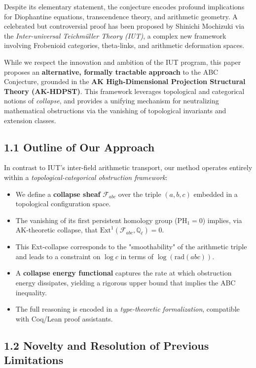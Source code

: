 \documentclass[11pt]{article}
\begin{document}
Despite its elementary statement, the conjecture encodes profound implications for Diophantine equations, transcendence theory, and arithmetic geometry. A celebrated but controversial proof has been proposed by Shinichi Mochizuki via the \emph{Inter-universal Teichm\"uller Theory (IUT)}, a complex new framework involving Frobenioid categories, theta-links, and arithmetic deformation spaces.

While we respect the innovation and ambition of the IUT program, this paper proposes an \textbf{alternative, formally tractable approach} to the ABC Conjecture, grounded in the \textbf{AK High-Dimensional Projection Structural Theory (AK-HDPST)}. This framework leverages topological and categorical notions of \emph{collapse}, and provides a unifying mechanism for neutralizing mathematical obstructions via the vanishing of topological invariants and extension classes.

\subsection*{1.1 Outline of Our Approach}

In contrast to IUT's inter-field arithmetic transport, our method operates entirely within a \emph{topological-categorical obstruction framework}:
\begin{itemize}
    \item We define a \textbf{collapse sheaf} $\mathcal{F}_{abc}$ over the triple $(a, b, c)$ embedded in a topological configuration space.
    \item The vanishing of its first persistent homology group ($\mathrm{PH}_1 = 0$) implies, via AK-theoretic collapse, that $\mathrm{Ext}^1(\mathcal{F}_{abc}, \mathbb{Q}_\ell) = 0$.
    \item This Ext-collapse corresponds to the "smoothability" of the arithmetic triple and leads to a constraint on $\log c$ in terms of $\log(\mathrm{rad}(abc))$.
    \item A \textbf{collapse energy functional} captures the rate at which obstruction energy dissipates, yielding a rigorous upper bound that implies the ABC inequality.
    \item The full reasoning is encoded in a \emph{type-theoretic formalization}, compatible with Coq/Lean proof assistants.
\end{itemize}

\subsection*{1.2 Novelty and Resolution of Previous Limitations}
\end{document}
